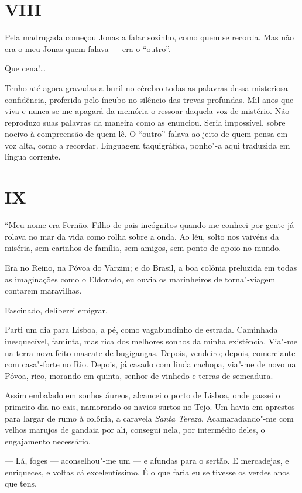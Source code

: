 \section*{VIII}

Pela madrugada começou Jonas a falar sozinho, como quem se recorda. Mas
não era o meu Jonas quem falava --- era o ``outro''.

Que cena!\ldots{}

Tenho até agora gravadas a buril no cérebro todas as palavras dessa
misteriosa confidência, proferida pelo íncubo no silêncio das trevas
profundas. Mil anos que viva e nunca se me apagará da memória o ressoar
daquela voz de mistério. Não reproduzo suas palavras da maneira como as
enunciou. Seria impossível, sobre nocivo à compreensão de quem lê. O
``outro'' falava ao jeito de quem pensa em voz alta, como a recordar.
Linguagem taquigráfica, ponho"-a aqui traduzida em língua corrente.

\section*{IX}

``Meu nome era Fernão. Filho de pais incógnitos quando me conheci por
gente já rolava no mar da vida como rolha sobre a onda. Ao léu, solto
nos vaivéns da miséria, sem carinhos de família, sem amigos, sem ponto
de apoio no mundo.

Era no Reino, na Póvoa do Varzim; e do Brasil, a boa colônia preluzida
em todas as imaginações como o Eldorado, eu ouvia os marinheiros de
torna"-viagem contarem maravilhas.

Fascinado, deliberei emigrar.

Parti um dia para Lisboa, a pé, como vagabundinho de estrada. Caminhada
inesquecível, faminta, mas rica dos melhores sonhos da minha existência.
Via"-me na terra nova feito mascate de bugigangas. Depois, vendeiro;
depois, comerciante com casa"-forte no Rio. Depois, já casado com linda
cachopa, via"-me de novo na Póvoa, rico, morando em quinta, senhor de
vinhedo e terras de semeadura.

Assim embalado em sonhos áureos, alcancei o porto de Lisboa, onde passei
o primeiro dia no cais, namorando os navios surtos no Tejo. Um havia em
aprestos para largar de rumo à colônia, a caravela \emph{Santa Tereza}.
Acamaradando"-me com velhos marujos de gandaia por ali, consegui nela,
por intermédio deles, o engajamento necessário.

--- Lá, foges --- aconselhou"-me um --- e afundas para o sertão. E
mercadejas, e enriqueces, e voltas cá excelentíssimo. É o que faria eu
se tivesse os verdes anos que tens.

